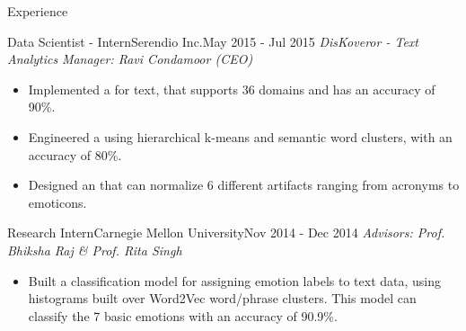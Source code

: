 \documentclass[]{mcdowellcv}
\begin{document}
\begin{cvsection}{Experience}
		\begin{cvsubsection}{Data Scientist - Intern}{Serendio Inc.}{May 2015 - Jul 2015}
		    \textit{DisKoveror - Text Analytics} \hfill \textit{Manager: Ravi Condamoor (CEO)}
			\begin{itemize}
            	\item Implemented a \href{https://github.com/tpsatish95/Universal-MultiDomain-Sentiment-Classifier}{} for text, that supports 36 domains and has an accuracy of 90\%.
                \item Engineered a \href{https://github.com/tpsatish95/Topic-Modeling-Social-Network-Text-Data}{} using hierarchical k-means and semantic word clusters, with an accuracy of 80\%.
                \item Designed an \href{https://github.com/tpsatish95/SocialTextFilter}{} that can normalize 6 different artifacts ranging from acronyms to emoticons.
			\end{itemize}
		\end{cvsubsection}
		
		\begin{cvsubsection}{Research Intern}{Carnegie Mellon University}{Nov 2014 - Dec 2014}
		    \textit{\href{https://github.com/tpsatish95/emotion-detection-from-text}{\color{blue!70}{Text-based Emotion Recognition System}}} \hfill \textit{Advisors: Prof. Bhiksha Raj \& Prof. Rita Singh}
			\begin{itemize}
				\item Built a classification model for assigning emotion labels to text data, using histograms built over Word2Vec word/phrase clusters. This model can classify the 7 basic emotions with an accuracy of 90.9\%.
			\end{itemize}
		\end{cvsubsection}
	\end{cvsection}
\end{document}
